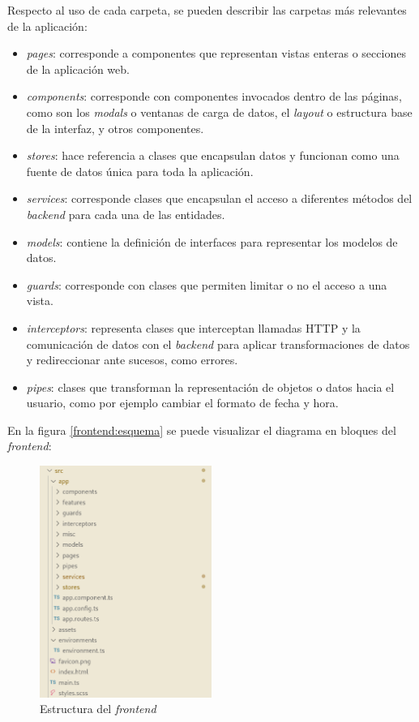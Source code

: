 Respecto al uso de cada carpeta, se pueden describir las carpetas más relevantes de la aplicación:
\begin{itemize}
	\item \textit{pages}: corresponde a componentes que representan vistas enteras o secciones de la aplicación web.
	\item \textit{components}: corresponde con componentes invocados dentro de las páginas, como son los \textit{modals} o ventanas de carga de datos, el \textit{layout} o estructura base de la interfaz, y otros componentes.
	\item \textit{stores}: hace referencia a clases que encapsulan datos y funcionan como una fuente de datos única para toda la aplicación\citep{NGRX:1}.
	\item \textit{services}: corresponde clases que encapsulan el acceso a diferentes métodos del \textit{backend} para cada una de las entidades.
	\item \textit{models}: contiene la definición de interfaces para representar los modelos de datos.
	\item \textit{guards}: corresponde con clases que permiten limitar o no el acceso a una vista.
	\item \textit{interceptors}:	representa clases que interceptan llamadas HTTP y la comunicación de datos con el \textit{backend} para aplicar transformaciones de datos y redireccionar ante sucesos, como errores.
	\item \textit{pipes}: clases que transforman la representación de objetos o datos hacia el usuario, como por ejemplo cambiar el formato de fecha y hora\citep{ANGULAR:5}.
\end{itemize}

En la figura \ref{frontend:esquema} se puede visualizar el diagrama en bloques del \textit{frontend}:
\begin{figure}[H]
	\centering
	\includegraphics[width=0.5\textwidth]{./Figures/frontend-folder.png}
	\caption{Estructura del \textit{frontend}}
	\label{frontend:folder}
\end{figure}


